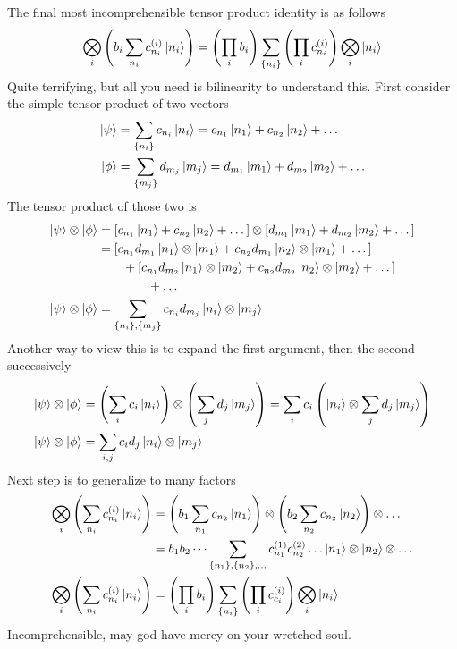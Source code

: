 \documentclass[../../../main.tex]{subfiles}
\begin{document}
The final most incomprehensible tensor product identity is as follows
\begin{equation*}
  \bigotimes_i \left(b_i \sum_{n_i } c_{n_i }^{(i )}\ket{n_i}  \right)
  =
  \left( \prod_i b_i \right) \sum_{\left\{ n_i  \right\} }\left( \prod_i  c_{n_i} ^{(i)}\right)  \bigotimes_i \ket{n_i}
\end{equation*}
Quite terrifying, but all you need is bilinearity to understand this.
First consider the simple tensor product of two vectors
\begin{align*}
  \ket{\psi} & =
  \sum_{\left\{ n_i \right\} } c_{n_i} \ket{n_i}
  =
  c_{n_1} \ket{n_1} + c_{n_2} \ket{n_2}+\dots \\
  \ket{\phi} & =
  \sum_{\left\{ m_j \right\} } d_{m_j} \ket{m_j}
  =
  d_{m_1} \ket{m_1} + d_{m_2} \ket{m_2}+\dots
\end{align*}
The tensor product of those two is
\begin{align*}
  \ket{\psi } \otimes \ket{\phi}
   & =  \left[        c_{n_1} \ket{n_1} + c_{n_2} \ket{n_2}+\dots\right] \otimes \left[       d_{m_1} \ket{m_1} + d_{m_2} \ket{m_2}+\dots \right] \\
   & =  \left[        c_{n_1} d_{m_1} \ket{n_1}\otimes \ket{m_1}+ c_{n_2} d_{m_1} \ket{n_2}\otimes \ket{m_1} +\dots\right]                        \\
   & \qquad+  \left[        c_{n_1} d_{m_2} \ket{n_1}\otimes \ket{m_2}+ c_{n_2} d_{m_2} \ket{n_2}\otimes \ket{m_2} +\dots\right]                  \\
   & \qquad\qquad+  \dots                                                                                                                         \\
  \ket{\psi } \otimes \ket{\phi}
   & = \sum_{\left\{ n_i  \right\} ,\left\{ m_j \right\}  } c_{n_i} d_{m_j} \ket{n_i}\otimes \ket{m_j}
\end{align*}
Another way to view this is to expand the first argument, then the second successively
\begin{align*}
  \ket{\psi}\otimes \ket{\phi}
   & =
  \left(        \sum_{i } c_i \ket{n_i} \right) \otimes
  \left(        \sum_{j } d_j \ket{m_j}\right)
  =
  \sum_{i } c_i \left(\ket{n_i} \otimes\sum_{j } d_j \ket{m_j}\right) \\
  \ket{\psi}\otimes \ket{\phi}
   & =
  \sum_{i,j } c_id_j \ket{n_i}\otimes \ket{m_j}
\end{align*}
Next step is to generalize to many factors
\begin{align*}
  \bigotimes_i \left( \sum_{n_i } c_{n_i }^{(i )}\ket{n_i}  \right)
   & =
  \left(b_1\sum_{n_1 } c_{n_2} \ket{n_1} \right) \otimes \left(b_2\sum_{n_2 } c_{n_2} \ket{n_2}\right) \otimes\dots
  \\
   & =b_1b_2\dots \sum_{\left\{ n_1  \right\} ,\left\{ n_2 \right\} ,\dots} c_{n_1} ^{(1)}c_{n_2} ^{(2)}\dots \ket{n_1}\otimes \ket{n_2}\otimes \dots
  \\
  \bigotimes_i \left( \sum_{n_i } c_{n_i }^{(i )}\ket{n_i}  \right)
   & =
  \left( \prod_i b_i \right) \sum_{\left\{ n_i  \right\} }\left( \prod_i  c_{c_i} ^{(i)}\right)  \bigotimes_i \ket{n_i}
\end{align*}
Incomprehensible, may god have mercy on your wretched soul.
\end{document}
